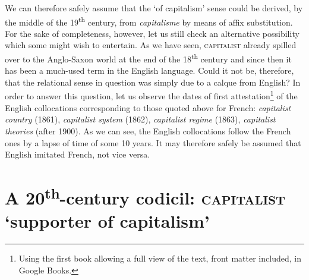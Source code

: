 \documentclass[output=paper]{langsci/langscibook}
\begin{document}
We can therefore safely assume that the `of capitalism' sense could be
derived, by the middle of the 19\textsuperscript{th} century, from
\emph{capitalisme} by means of affix substitution. For the sake of completeness,
however, let us still check an alternative possibility which some might
wish to entertain. As we have seen, \textsc{capitalist} already spilled
over to the Anglo-Saxon world at the end of the 18\textsuperscript{th}
century and since then it has been a much-used term in the English
language. Could it not be, therefore, that the relational sense in
question was simply due to a calque from English? In order to answer
this question, let us observe the dates of first
attestation\footnote{Using the first book allowing a full view of the
  text, front matter included, in Google Books.} of the English
collocations corresponding to those quoted above for French:
\emph{capitalist country} (1861), \emph{capitalist system} (1862),
\emph{capitalist regime} (1863), \emph{capitalist theories} (after
1900). As we can see, the English collocations follow the French ones by
a lapse of time of some 10 years. It may therefore safely be assumed
that English imitated French, not vice versa.

\section{A 20\textsuperscript{th}-century codicil: \textsc{capitalist}
`supporter of capitalism'}
\end{document}
